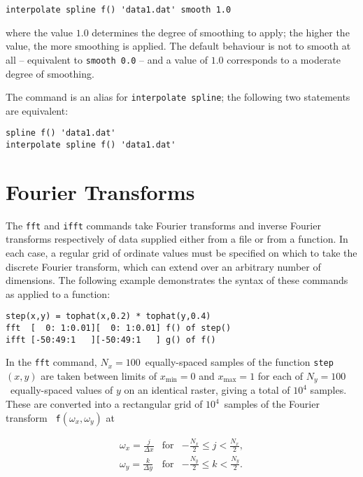 \begin{verbatim}
interpolate spline f() 'data1.dat' smooth 1.0
\end{verbatim}

\noindent where the value $1.0$ determines the degree of smoothing to apply;
the higher the value, the more smoothing is applied. The default behaviour is
not to smooth at all -- equivalent to {\tt smooth 0.0} -- and a value of $1.0$
corresponds to a moderate degree of smoothing.

The  command is an alias for {\tt interpolate spline}; the
following two statements are equivalent:

\begin{verbatim}
spline f() 'data1.dat'
interpolate spline f() 'data1.dat'
\end{verbatim}


\section{Fourier Transforms}

The {\tt fft} and {\tt ifft} commands take Fourier
transforms and inverse Fourier transforms respectively of data supplied either
from a file or from a function. In each case, a regular grid of ordinate values
must be specified on which to take the discrete Fourier transform, which can
extend over an arbitrary number of dimensions. The following example
demonstrates the syntax of these commands as applied to a function:

\begin{verbatim}
step(x,y) = tophat(x,0.2) * tophat(y,0.4)
fft  [  0: 1:0.01][  0: 1:0.01] f() of step()
ifft [-50:49:1   ][-50:49:1   ] g() of f()
\end{verbatim}

\noindent In the {\tt fft} command, $N_x=100$~equally-spaced samples of the
function {\tt step}$(x,y)$ are taken between limits of $x_\mathrm{min}=0$ and
$x_\mathrm{max}=1$ for each of $N_y=100$~equally-spaced values of $y$ on an
identical raster, giving a total of $10^4$ samples. These are converted into a
rectangular grid of $10^4$~samples of the Fourier transform {\tt
f}$(\omega_x,\omega_y)$ at

\begin{eqnarray}
\omega_x = \frac{j}{\Delta x} & \textrm{for} & -\frac{N_x}{2}\leq j <\frac{N_x}{2} , \nonumber \\
\omega_y = \frac{k}{\Delta y} & \textrm{for} & -\frac{N_y}{2}\leq k <\frac{N_y}{2} . \nonumber
\end{eqnarray}


